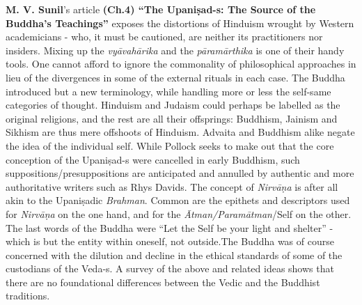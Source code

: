 \textbf{M. V. Sunil}’s article \textbf{(Ch.4) “The Upaniṣad-s: The Source of the Buddha’s Teachings”} exposes the distortions of Hinduism wrought by Western academicians - who, it must be cautioned, are neither its practitioners nor insiders. Mixing up the \textit{vyāvahārika} and the \textit{pāramārthika} is one of their handy tools. One cannot afford to ignore the commonality of philosophical approaches in lieu of the divergences in some of the external rituals in each case. The Buddha introduced but a new terminology, while handling more or less the self-same categories of thought. Hinduism and Judaism could perhaps be labelled as the original religions, and the rest are all their offsprings: Buddhism, Jainism and Sikhism are thus mere offshoots of Hinduism. Advaita and Buddhism alike negate the idea of the individual self. While Pollock seeks to make out that the core conception of the Upaniṣad-s were cancelled in early Buddhism, such suppositions/presuppositions are anticipated and annulled by authentic and more authoritative writers such as Rhys Davids. The concept of \textit{Nirvāṇa} is after all akin to the Upaniṣadic \textit{Brahman}. Common are the epithets and descriptors used for \textit{Nirvāṇa} on the one hand, and for the \textit{Ātman/Paramātman}/Self on the other. The last words of the Buddha were “Let the Self be your light and shelter” - which is but the entity within oneself, not outside.The Buddha was of course concerned with the dilution and decline in the ethical standards of some of the custodians of the Veda-s. A survey of the above and related ideas shows that there are no foundational differences between the Vedic and the Buddhist traditions.

